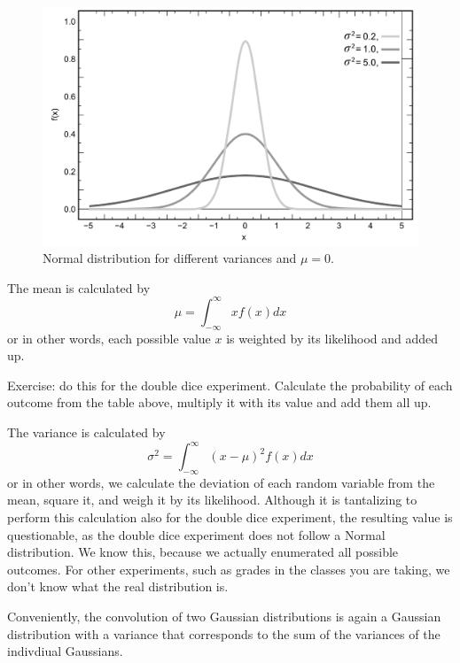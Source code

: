 \begin{figure}
	\centering
		\includegraphics[width=\textwidth]{figs/Normal_Distribution_PDF}
	\caption{Normal distribution for different variances and $\mu=0$.}
	\label{fig:Normal_Distribution_PDF}
\end{figure}

The mean is calculated by
\begin{equation}
\mu=\int_{-\infty}^{\infty}xf(x)dx
\end{equation}
or in other words, each possible value $ x$ is weighted by its likelihood and added up.
\begin{framed}
Exercise: do this for the double dice experiment. Calculate the probability of each outcome from the table above, multiply it with its value and add them all up.
\end{framed}

The variance is calculated by
\begin{equation}
\sigma^2=\int_{-\infty}^{\infty}(x-\mu)^2f(x)dx
\end{equation}
or in other words, we calculate the deviation of each random variable from the mean, square it, and weigh it by its likelihood. Although it is tantalizing to perform this calculation also for the double dice experiment, the resulting value is questionable, as the double dice experiment does not follow a Normal distribution. We know this, because we actually enumerated all possible outcomes. For other experiments, such as grades in the classes you are taking, we don't know what the real distribution is.

Conveniently, the convolution of two Gaussian distributions is again a Gaussian distribution with a variance that corresponds to the sum of the variances of the indivdiual Gaussians. 

